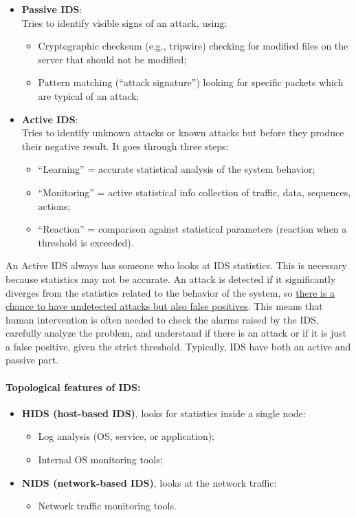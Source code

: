 \begin{itemize}
    \item \textbf{Passive IDS}:\\
          Tries to identify visible signs of an attack, using:
          \begin{itemize}
              \item Cryptographic checksum (e.g., tripwire) checking for modified files on the server that should not be modified;
              \item Pattern matching (“attack signature”) looking for specific packets which are typical of an attack;
          \end{itemize}

    \item \textbf{Active IDS}:\\
          Tries to identify unknown attacks or known attacks but before they produce their negative result. It goes through three steps:
          \begin{itemize}
              \item “Learning” = accurate statistical analysis of the system behavior;
              \item “Monitoring” = active statistical info collection of traffic, data, sequences, actions;
              \item “Reaction” = comparison against statistical parameters (reaction when a threshold is exceeded).
          \end{itemize}
\end{itemize}

An Active IDS always has someone who looks at IDS statistics. This is necessary because statistics may not be accurate. An attack is detected if it significantly diverges from the statistics related to the behavior of the system, so \ul{there is a chance to have undetected attacks but also false positives}. This means that human intervention is often needed to check the alarms raised by the IDS, carefully analyze the problem, and understand if there is an attack or if it is just a false positive, given the strict threshold. Typically, IDS have both an active and passive part.

\paragraph{Topological features of IDS:}
\begin{itemize}
    \item \textbf{HIDS (host-based IDS)}, looks for statistics inside a single node:
        \begin{itemize}
            \item Log analysis (OS, service, or application);
            \item Internal OS monitoring tools;
        \end{itemize}
    \item \textbf{NIDS (network-based IDS)}, looks at the network traffic:
        \begin{itemize}
            \item Network traffic monitoring tools.
        \end{itemize}
\end{itemize}
